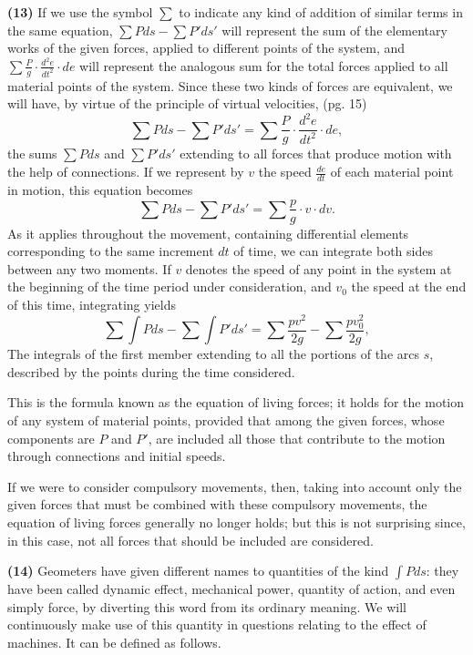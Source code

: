 \documentclass{book}
\begin{document}
\textbf{(13)} If we use the symbol \( \sum \) to indicate any kind of addition of similar terms in the same equation, \( \sum Pds - \sum P'ds' \) will represent the sum of the elementary works of the given forces, applied to different points of the system, and \( \sum \frac{P}{g} \cdot \frac{d^2e}{dt^2} \cdot de \) will represent the analogous sum for the total forces applied to all material points of the system. Since these two kinds of forces are equivalent, we will have, by virtue of the principle of virtual velocities, 
\newpage
(pg. 15)
\[ \sum Pds - \sum P'ds' = \sum \frac{P}{g} \cdot \frac{d^2e}{dt^2} \cdot de, \]
the sums \( \sum Pds \) and \( \sum P'ds' \) extending to all forces that produce motion with the help of connections.
If we represent by \( v \) the speed \( \frac{de}{dt} \) of each material point in motion, this equation becomes
\[ \sum Pds - \sum P'ds' = \sum \frac{p}{g} \cdot v \cdot dv. \]
As it applies throughout the movement, containing differential elements corresponding to the same increment \( dt \) of time, we can integrate both sides between any two moments. If \( v \) denotes the speed of any point in the system at the beginning of the time period under consideration, and \( v_0 \) the speed at the end of this time, integrating yields
\[ \sum \int Pds - \sum \int P'ds' = \sum \frac{pv^2}{2g} - \sum \frac{pv_0^2}{2g}, \]
The integrals of the first member extending to all the portions of the arcs \( s \), described by the points during the time considered.

This is the formula known as the equation of living forces; it holds for the motion of any system of material points, provided that among the given forces, whose components are \( P \) and \( P' \), are included all those that contribute to the motion through connections and initial speeds.

If we were to consider compulsory movements, then, taking into account only the given forces that must be combined with these compulsory movements, the equation of living forces generally no longer holds; but this is not surprising since, in this case, not all forces that should be included are considered.

\textbf{(14)} Geometers have given different names to quantities of the kind \( \int Pds \): they have been called dynamic effect, mechanical power, quantity of action, and even simply force, by diverting this word from its ordinary meaning. We will continuously make use of this quantity in questions relating to the effect of machines. It can be defined as follows.
\end{document}
